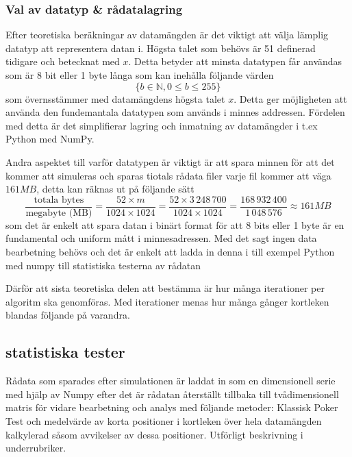 \documentclass[a4paper]{article}
\begin{document}
\subsubsection{Val av datatyp \& rådatalagring} Efter teoretiska beräkningar av
datamängden är det viktigt att välja lämplig datatyp att representera datan i.
Högsta talet som behövs är 51 definerad tidigare och betecknat med $x$. Detta
betyder att minsta datatypen får användas som är 8 bit eller 1 byte långa som
kan inehålla följande värden $$\{b \in \mathbb{N},  0 \leq b \leq 255 \}$$ som
överns\-stämmer med datamängdens högsta talet $x$. Detta ger möjligheten att
använda den fundemantala datatypen som används i minnes addressen. Fördelen med
detta är det simplifierar lagring och inmatning av datamängder i t.ex Python
med NumPy.

Andra aspektet till varför datatypen är viktigt är att spara minnen för att det
kommer att simuleras och sparas tiotals rådata filer varje fil kommer att väga
$161 MB$,
detta kan räknas ut på följande sätt
$$ \frac{\text{totala bytes}}{\text{megabyte (MB)}} = \frac{52 \times m }{1024 \times
1024} = \frac{52 \times 3\,248\,700}{1024 \times 1024} = \frac{168\,932\,400}{1\,048\,576} \approx 161 MB 
$$
som det är enkelt att spara datan i binärt format för att 8 bits eller 1 byte
är en fundamental och uniform mått i minnesadressen. Med det sagt ingen data
bearbetning behövs och det är enkelt att ladda in denna i till exempel Python
med numpy till statistiska testerna av rådatan

Därför att sista teoretiska delen att bestämma
är hur många iterationer per algoritm ska genomföras. Med iterationer menas
hur många gånger kortleken blandas följande på varandra.

\subsection{statistiska tester}
Rådata som sparades efter simulationen är laddat in som en dimensionell serie
med hjälp av Numpy  efter det är rådatan återställt tillbaka till
tvådimensionell matris för vidare bearbetning och analys med följande metoder:
Klassisk Poker Test och medelvärde av korta positioner i kortleken över hela
datamängden kalkylerad såsom avvikelser av dessa positioner. Utförligt
beskrivning i underrubriker. 
\end{document}
